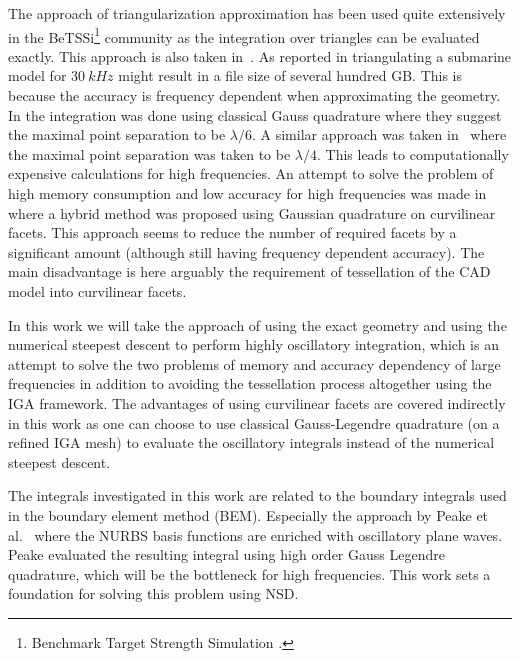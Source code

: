The approach of triangularization approximation has been used quite extensively in the BeTSSi\footnote{Benchmark Target Strength Simulation \cite{Nolte2014bib}.} community \cite{Schneider2003asb,Fillinger2014aen,Oestberg2016tes,Gilroy2017tes} as the integration over triangles can be evaluated exactly. This approach is also taken in~\cite{Foote2002cka,Abawi2016ksf}. As reported in \cite{Gilroy2017tes} triangulating a submarine model for $\SI{30}{kHz}$ might result in a file size of several hundred GB. This is because the accuracy is frequency dependent when approximating the geometry. In \cite{Foote2002cka} the integration was done using classical Gauss quadrature where they suggest the maximal point separation to be $\lambda/6$. A similar approach was taken in~\cite{Pignier2015aka} where the maximal point separation was taken to be $\lambda/4$. This leads to computationally expensive calculations for high frequencies. An attempt to solve the problem of high memory consumption and low accuracy for high frequencies was made in~\cite{Lavia2018mhf} where a hybrid method was proposed using Gaussian quadrature on curvilinear facets. This approach seems to reduce the number of required facets by a significant amount (although still having frequency dependent accuracy). The main disadvantage is here arguably the requirement of tessellation of the CAD model into curvilinear facets. 

In this work we will take the approach of using the exact geometry and using the numerical steepest descent to perform highly oscillatory integration, which is an attempt to solve the two problems of memory and accuracy dependency of large frequencies in addition to avoiding the tessellation process altogether using the IGA framework. The advantages of using curvilinear facets are covered indirectly in this work as one can choose to use classical Gauss-Legendre quadrature (on a refined IGA mesh) to evaluate the oscillatory integrals instead of the numerical steepest descent.

The integrals investigated in this work are related to the boundary integrals used in the boundary element method (BEM). Especially the approach by Peake et al.~\cite{Peake2015eib} where the NURBS basis functions are enriched with oscillatory plane waves. Peake evaluated the resulting integral using high order Gauss Legendre quadrature, which will be the bottleneck for high frequencies. This work sets a foundation for solving this problem using NSD.

